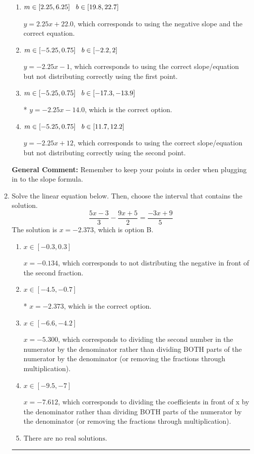 \documentclass{extbook}[14pt]
\newcommand{\litem}[1]{\item #1

\rule{\textwidth}{0.4pt}}
\begin{document}
\begin{enumerate}
{\begin{enumerate}[label=\Alph*.]
 $y = -2.25x + 14.0$, which corresponds to using the correct slope and getting the negative y-intercept.
\item \( m \in [2.25, 6.25] \hspace*{3mm} b \in [19.8, 22.7] \)

 $y = 2.25x + 22.0$, which corresponds to using the negative slope and the correct equation.
\item \( m \in [-5.25, 0.75] \hspace*{3mm} b \in [-2.2, 2] \)

 $y = -2.25x -1$, which corresponds to using the correct slope/equation but not distributing correctly using the first point.
\item \( m \in [-5.25, 0.75] \hspace*{3mm} b \in [-17.3, -13.9] \)

* $y = -2.25x -14.0$, which is the correct option.
\item \( m \in [-5.25, 0.75] \hspace*{3mm} b \in [11.7, 12.2] \)

 $y = -2.25x + 12$, which corresponds to using the correct slope/equation but not distributing correctly using the second point.
\end{enumerate}

\textbf{General Comment:} Remember to keep your points in order when plugging in to the slope formula.
}
\litem{
Solve the linear equation below. Then, choose the interval that contains the solution.
\[ \frac{5x -3}{3} - \frac{9x + 5}{2} = \frac{-3x + 9}{5} \]The solution is \( x = -2.373 \), which is option B.\begin{enumerate}[label=\Alph*.]
\item \( x \in [-0.3, 0.3] \)

 $x = -0.134$, which corresponds to not distributing the negative in front of the second fraction.
\item \( x \in [-4.5, -0.7] \)

* $x = -2.373$, which is the correct option.
\item \( x \in [-6.6, -4.2] \)

 $x = -5.300$, which corresponds to dividing the second number in the numerator by the denominator rather than dividing BOTH parts of the numerator by the denominator (or removing the fractions through multiplication).
\item \( x \in [-9.5, -7] \)

 $x = -7.612$, which corresponds to dividing the coefficients in front of x by the denominator rather than dividing BOTH parts of the numerator by the denominator (or removing the fractions through multiplication).
\item \( \text{There are no real solutions.} \)


\end{enumerate}}
\end{enumerate}
\end{document}
